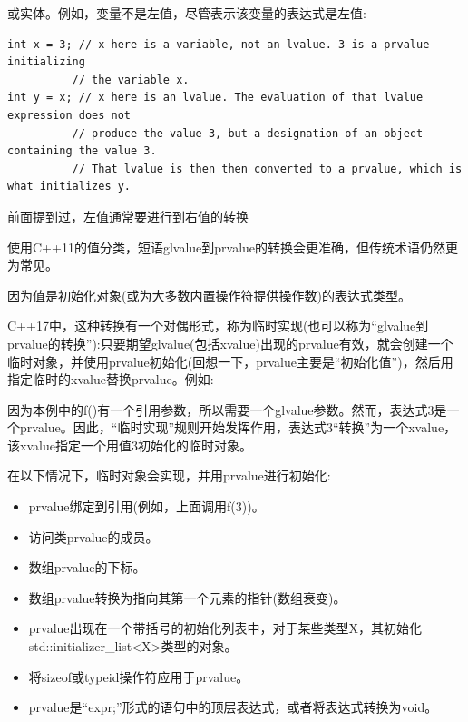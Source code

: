 或实体。例如，变量不是左值，尽管表示该变量的表达式是左值:

\begin{lstlisting}[style=styleCXX]
int x = 3; // x here is a variable, not an lvalue. 3 is a prvalue initializing
		  // the variable x.
int y = x; // x here is an lvalue. The evaluation of that lvalue expression does not
		  // produce the value 3, but a designation of an object containing the value 3.
		  // That lvalue is then then converted to a prvalue, which is what initializes y.
\end{lstlisting}


前面提到过，左值通常要进行到右值的转换

\begin{tcolorbox}[colback=webgreen!5!white,colframe=webgreen!75!black]
\hspace*{0.75cm}使用C++11的值分类，短语glvalue到prvalue的转换会更准确，但传统术语仍然更为常见。
\end{tcolorbox}

因为值是初始化对象(或为大多数内置操作符提供操作数)的表达式类型。

C++17中，这种转换有一个对偶形式，称为临时实现(也可以称为“glvalue到prvalue的转换”):只要期望glvalue(包括xvalue)出现的prvalue有效，就会创建一个临时对象，并使用prvalue初始化(回想一下，prvalue主要是“初始化值”)，然后用指定临时的xvalue替换prvalue。例如:

因为本例中的f()有一个引用参数，所以需要一个glvalue参数。然而，表达式3是一个prvalue。因此，“临时实现”规则开始发挥作用，表达式3“转换”为一个xvalue，该xvalue指定一个用值3初始化的临时对象。

在以下情况下，临时对象会实现，并用prvalue进行初始化:

\begin{itemize}
\item 
prvalue绑定到引用(例如，上面调用f(3))。

\item 
访问类prvalue的成员。

\item 
数组prvalue的下标。

\item 
数组prvalue转换为指向其第一个元素的指针(数组衰变)。

\item 
prvalue出现在一个带括号的初始化列表中，对于某些类型X，其初始化std::initializer\_list<X>类型的对象。

\item 
将sizeof或typeid操作符应用于prvalue。

\item 
prvalue是“expr;”形式的语句中的顶层表达式，或者将表达式转换为void。
\end{itemize}

